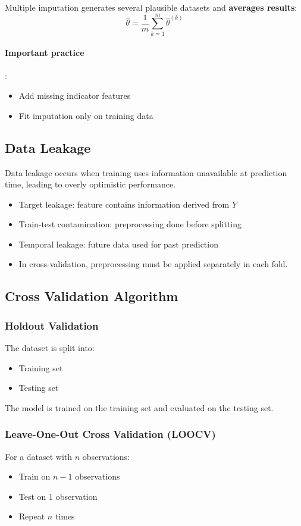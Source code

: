 \documentclass[10pt,a4paper]{article}
\begin{document}
	Multiple imputation generates several plausible datasets and \textbf{averages results}:
	\[
	\hat{\theta} = \frac{1}{m} \sum_{k=1}^{m} \hat{\theta}^{(k)}
	\]

	\paragraph{Important practice}:
	\begin{itemize}
		\item Add missing indicator features
		\item Fit imputation only on training data
	\end{itemize}

	\subsection{Data Leakage}

	Data leakage occurs when training uses information unavailable at prediction time, leading to overly optimistic performance.

	\begin{itemize}
		\item Target leakage: feature contains information derived from $Y$
		\item Train-test contamination: preprocessing done before splitting
		\item Temporal leakage: future data used for past prediction
		\item In cross-validation, preprocessing must be applied separately in each fold.
	\end{itemize}


	\subsection{Cross Validation Algorithm}
	
	\subsubsection{Holdout Validation}
	The dataset is split into:
	\begin{itemize}
	    \item Training set
	    \item Testing set
	\end{itemize}
	
	The model is trained on the training set and evaluated on the testing set.
	
	\subsubsection{Leave-One-Out Cross Validation (LOOCV)}
	For a dataset with \(n\) observations:
	\begin{itemize}
	    \item Train on \(n-1\) observations
	    \item Test on 1 observation
	    \item Repeat \(n\) times
	\end{itemize}
	
\end{document}
